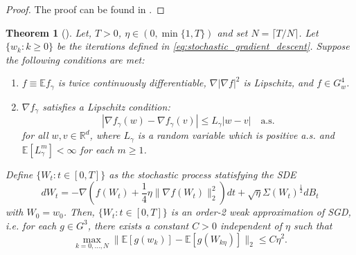 \documentclass[12pt]{article}
\newtheorem{theorem}{Theorem}[section]
\theoremstyle{definition}
\numberwithin{equation}{section}
\newcommand{\R}{\mathbb{R}}
\newcommand{\E}{\mathbb{E}}
\newcommand{\ev}[1]{\mathbb{E}\left[{#1}\right]}
\newcommand{\norm}[1]{\lVert{#1}\rVert_2}
\begin{document}
\begin{proof}
  The proof can be found in \cite[Lemma 29]{liStochasticModifiedEquations2019}.
\end{proof}
\begin{theorem}[\autocite{liStochasticModifiedEquations2019}]
  \label{thm:second_order}
  Let, $T > 0$, $\eta \in (0, \min\{1,T\})$ and set $N = \lceil T/N \rceil$. Let $\{w_k:k\geq 0\}$ be the iterations defined in \eqref{eq:stochastic_gradient_descent}. Suppose the following conditions are met:
  \begin{enumerate}[label=(\roman*)]
    \item $f \equiv \E f_{\gamma}$ is twice continuously differentiable, $\nabla |\nabla f |^2$ is Lipschitz, and $f \in G^4_w$.
    \item $\nabla f_{\gamma}$ satisfies a Lipschitz condition:
    \begin{equation*}
      |\nabla f_{\gamma}(w) - \nabla f_{\gamma}(v)| \leq L_{\gamma} |w - v| \quad \text{a.s.}
    \end{equation*}
    for all $w,v \in \R^d$, where $L_{\gamma}$ is a random variable which is positive a.s. and $\ev{L_{\gamma}^m} < \infty$ for each $m \geq 1$.
  \end{enumerate}
  Define $\{W_t:t\in [0,T] \}$ as the stochastic process statisfying the SDE
  \begin{equation}
    \label{eq:second_order_sde}
    d W_t = -\nabla\left(f(W_t) + \frac{1}{4}\eta \norm{\nabla f(W_t)}^2\right)dt + \sqrt{\eta}\Sigma(W_t)^{\frac{1}{2}}dB_t
  \end{equation}
  with $W_0 = w_0$. Then, $\{W_t:t\in [0,T] \}$ is an order-2 weak approximation of SGD, i.e. for each $g \in G^3$, there exists a constant $C > 0$ independent of $\eta$ such that
  \begin{equation}
    \label{eq:second_order_convergence}
    \max_{k=0,\dots,N} \norm{\ev{g(w_k)} - \ev{g(W_{k\eta})}} \leq C \eta^2.
  \end{equation}
\end{theorem}
\end{document}
